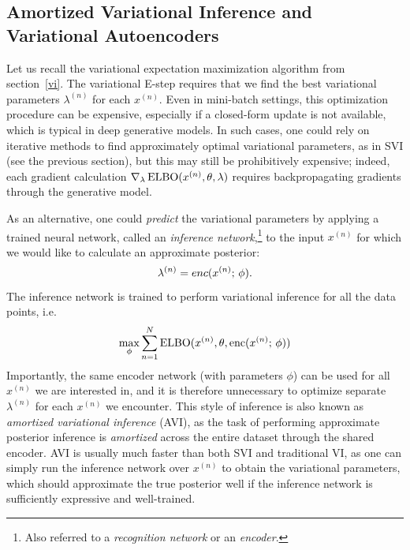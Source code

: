 \documentclass{article}
\begin{document}
\subsection{Amortized Variational Inference and Variational Autoencoders}\label{avi}
Let us recall the variational expectation maximization algorithm from section~\ref{vi}. The variational E-step requires that we find the best variational parameters $\lambda^{(n)}$ for each $x^{(n)}$.
Even in mini-batch settings, this optimization procedure can be expensive, especially if a closed-form update is not available, which is typical in deep generative models. In such cases, one could rely on iterative methods to find approximately optimal variational parameters, as in SVI (see the previous section), but this may still be prohibitively expensive; indeed, each gradient calculation $\nabla_\lambda\operatorname*{ELBO}(x^{(n)}, \theta, \lambda)$ requires backpropagating gradients through the generative model.

As an alternative, one could \emph{predict} the variational parameters 
by applying a trained neural network, called an \emph{inference network},\footnote{Also referred to a \textit{recognition network} or an \emph{encoder}.} to the input $x^{(n)}$ for which we would like to calculate an approximate posterior:
\[ \lambda^{(n)} = enc(x^{(n)} ; \, \phi). \]
The inference network is trained to perform variational inference for all the data points, i.e.
\[ \max_{\phi} \sum_{n=1}^{N} \operatorname*{ELBO}(x^{(n)}, \theta, \operatorname*{enc}(x^{(n)} ; \, \phi))\]
Importantly, the same encoder network (with parameters $\phi$) can be used for all $x^{(n)}$ we are interested in, and it is therefore unnecessary to optimize separate $\lambda^{(n)}$ for each $x^{(n)}$ we encounter. 
This style of inference is
also known as \emph{amortized variational inference} (AVI), as the task of performing  approximate posterior inference is \emph{amortized} across the entire dataset through the shared encoder. AVI is usually much faster than both SVI and traditional VI, as one can simply run the inference network over $x^{(n)}$ to obtain the variational parameters, which should approximate the true posterior well if the inference network is sufficiently expressive and well-trained.

\end{document}
